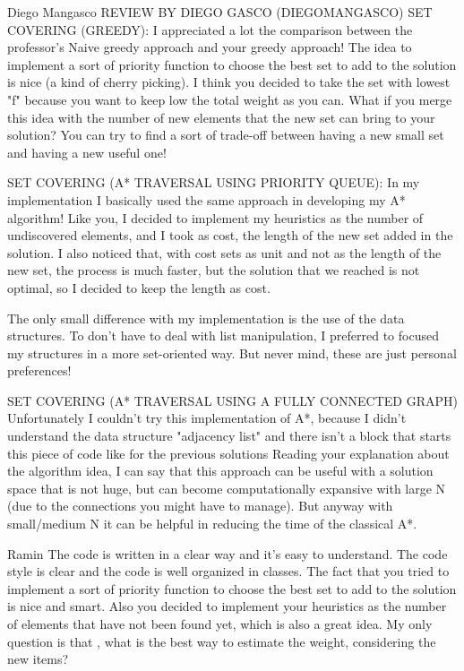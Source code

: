 \begin{tcolorbox}[colback=green!5!white,colframe=green!75!black,code={\singlespacing}]
  Diego Mangasco
  \tcblower
  REVIEW BY DIEGO GASCO (DIEGOMANGASCO)
SET COVERING (GREEDY):
I appreciated a lot the comparison between the professor's Naive greedy approach and your greedy approach!
The idea to implement a sort of priority function to choose the best set to add to the solution is nice (a kind of cherry picking).
I think you decided to take the set with lowest "f" because you want to keep low the total weight as you can.
What if you merge this idea with the number of new elements that the new set can bring to your solution?
You can try to find a sort of trade-off between having a new small set and having a new useful one!

SET COVERING (A* TRAVERSAL USING PRIORITY QUEUE):
In my implementation I basically used the same approach in developing my A* algorithm!
Like you, I decided to implement my heuristics as the number of undiscovered elements, and I took as cost, the length of the new set added in the solution.
I also noticed that, with cost sets as unit and not as the length of the new set, the process is much faster, but the solution that we reached is not optimal, so I decided to keep the length as cost.

The only small difference with my implementation is the use of the data structures.
To don't have to deal with list manipulation, I preferred to focused my structures in a more set-oriented way.
But never mind, these are just personal preferences!

SET COVERING (A* TRAVERSAL USING A FULLY CONNECTED GRAPH)
Unfortunately I couldn't try this implementation of A*, because I didn't understand the data structure "adjacency list" and there isn't a block that starts this piece of code like for the previous solutions
Reading your explanation about the algorithm idea, I can say that this approach can be useful with a solution space that is not huge, but can become computationally expansive with large N (due to the connections you might have to manage).
But anyway with small/medium N it can be helpful in reducing the time of the classical A*.

\end{tcolorbox}

\begin{tcolorbox}[colback=green!5!white,colframe=green!75!black,code={\singlespacing}]
  Ramin
  \tcblower
The code is written in a clear way and it's easy to understand. The code style is clear and the code is well organized in classes.
The fact that you tried to implement a sort of priority function to choose the best set to add to the solution is nice and smart.
Also you decided to implement your heuristics as the number of elements that have not been found yet, which is also a great idea.
My only question is that , what is the best way to estimate the weight, considering the new items?
\end{tcolorbox}

